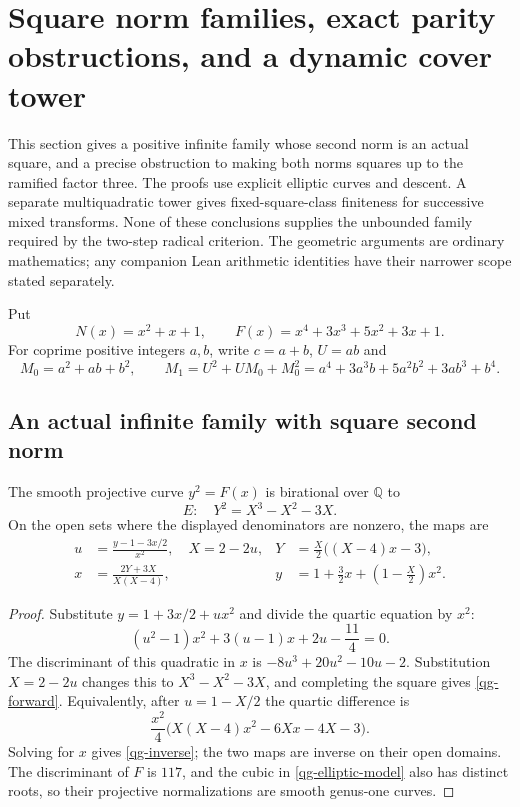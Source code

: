 \section{Square norm families, exact parity obstructions, and a dynamic cover tower}
\label{qg-section}

This section gives a positive infinite family whose second norm is an actual
square, and a precise obstruction to making both norms squares up to the
ramified factor three. The proofs use explicit elliptic curves and descent.
A separate multiquadratic tower gives fixed-square-class finiteness for
successive mixed transforms. None of these conclusions supplies the unbounded
family required by the two-step radical criterion. The geometric arguments
are ordinary mathematics; any companion Lean arithmetic identities have
their narrower scope stated separately.

Put
\[
 N(x)=x^2+x+1,\qquad F(x)=x^4+3x^3+5x^2+3x+1.
\]
For coprime positive integers $a,b$, write $c=a+b$, $U=ab$ and
\[
 M_0=a^2+ab+b^2,\qquad
 M_1=U^2+UM_0+M_0^2
     =a^4+3a^3b+5a^2b^2+3ab^3+b^4.
\]

\subsection{An actual infinite family with square second norm}
\begin{lemma}\label{qg-birational}
The smooth projective curve $y^2=F(x)$ is birational over $\mathbb Q$ to
\begin{equation}\label{qg-elliptic-model}
 E:\quad Y^2=X^3-X^2-3X.
\end{equation}
On the open sets where the displayed denominators are nonzero, the maps are
\begin{align}
 u&=\frac{y-1-3x/2}{x^2},\quad X=2-2u,
 &Y&=\frac X2\bigl((X-4)x-3\bigr),\label{qg-forward}\\
 x&=\frac{2Y+3X}{X(X-4)},
 &y&=1+\frac32x+\left(1-\frac X2\right)x^2.
 \label{qg-inverse}
\end{align}
\end{lemma}
\begin{proof}
Substitute $y=1+3x/2+ux^2$ and divide the quartic equation by $x^2$:
\[
 (u^2-1)x^2+3(u-1)x+2u-\frac{11}4=0.
\]
The discriminant of this quadratic in $x$ is
$-8u^3+20u^2-10u-2$. Substitution $X=2-2u$ changes this to
$X^3-X^2-3X$, and completing the square gives \eqref{qg-forward}.
Equivalently, after $u=1-X/2$ the quartic difference is
\[
 \frac{x^2}4\bigl(X(X-4)x^2-6Xx-4X-3\bigr).
\]
Solving for $x$ gives \eqref{qg-inverse}; the two maps are inverse on their
open domains. The discriminant of $F$ is $117$, and the cubic in
\eqref{qg-elliptic-model} also has distinct roots, so their projective
normalizations are smooth genus-one curves.
\end{proof}


